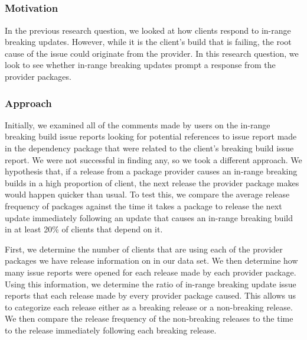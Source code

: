 \subsection{\rqthree}
\label{sec:results:rq3}
\subsubsection{Motivation}
In the previous research question, we looked at how clients respond to in-range breaking updates. However, while it is the client's build that is failing, the root cause of the issue could originate from the provider. In this research question, we look to see whether in-range breaking updates prompt a response from the provider packages.
\subsubsection{Approach}
Initially, we examined all of the comments made by users on the in-range breaking build issue reports looking for potential references to issue report made in the dependency package that were related to the client's breaking build issue report. We were not successful in finding any, so we took a different approach. We hypothesis that, if a release from a package provider causes an in-range breaking builds in a high proportion of client, the next release the provider package makes would happen quicker than usual. To test this, we compare the average release frequency of packages against the time it takes a package to release the next update immediately following an update that causes an in-range breaking build in at least 20\% of clients that depend on it.
\par
First, we determine the number of clients that are using each of the provider packages we have release information on in our data set. We then determine how many issue reports were opened for each release made by each provider package. Using this information, we determine the ratio of in-range breaking update issue reports that each release made by every provider package caused. This allows us to categorize each release either as a breaking release or a non-breaking release. We then compare the release frequency of the non-breaking releases to the time to the release immediately following each breaking release.

